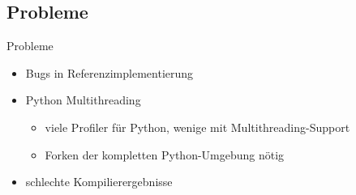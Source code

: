 \subsection{Probleme}
\begin{frame}{Probleme}
	\begin{itemize}
		\item Bugs in Referenzimplementierung
		\item<2-> Python Multithreading
		\begin{itemize}
			\item<3-> viele Profiler für Python, wenige mit Multithreading-Support
			\item<4-> Forken der kompletten Python-Umgebung nötig
		\end{itemize}
		\item<5-> schlechte Kompilierergebnisse
	\end{itemize}
\end{frame}